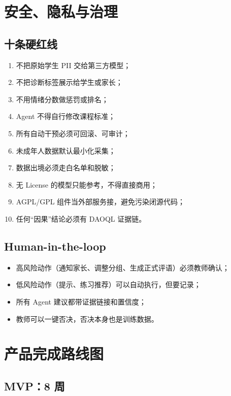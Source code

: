 \documentclass[UTF8,a4paper,11pt]{ctexart}
\begin{document}
\section{安全、隐私与治理}

\subsection{十条硬红线}

\begin{enumerate}[leftmargin=2em]
\item 不把原始学生 PII 交给第三方模型；
\item 不把诊断标签展示给学生或家长；
\item 不用情绪分数做惩罚或排名；
\item Agent 不得自行修改课程标准；
\item 所有自动干预必须可回滚、可审计；
\item 未成年人数据默认最小化采集；
\item 数据出境必须走白名单和脱敏；
\item 无 License 的模型只能参考，不得直接商用；
\item AGPL/GPL 组件当外部服务接，避免污染闭源代码；
\item 任何“因果”结论必须有 DAOQL 证据链。
\end{enumerate}

\subsection{Human-in-the-loop}

\begin{itemize}[leftmargin=2em]
\item 高风险动作（通知家长、调整分组、生成正式评语）必须教师确认；
\item 低风险动作（提示、练习推荐）可以自动执行，但要记录；
\item 所有 Agent 建议都带证据链接和置信度；
\item 教师可以一键否决，否决本身也是训练数据。
\end{itemize}

\section{产品完成路线图}

\subsection{MVP：8 周}
\end{document}

